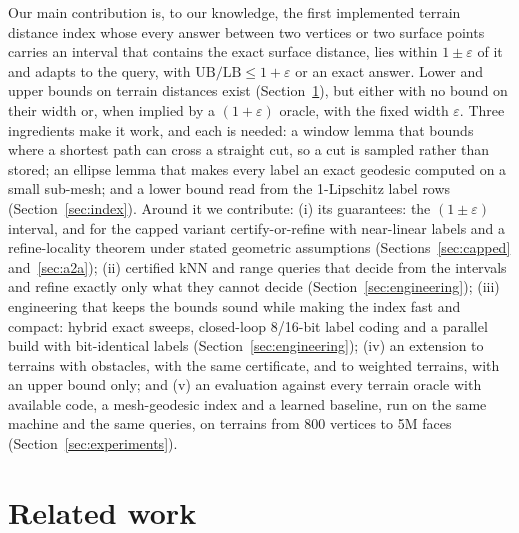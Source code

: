 \documentclass[sigconf,nonacm,screen]{acmart}
\newcommand{\LB}{\mathrm{LB}}
\newcommand{\UB}{\mathrm{UB}}
\newcommand{\eps}{\varepsilon}
\begin{document}
Our main contribution is, to our knowledge, the first implemented terrain distance index whose every answer
between two vertices or two surface points carries an interval that contains the exact surface distance, lies within
$1\pm\eps$ of it and adapts to the query, with $\UB/\LB\le1+\eps$ or an exact answer. Lower and upper bounds on
terrain distances exist (Section~\ref{sec:related}), but either with no bound on their width or, when implied by a
$(1+\eps)$ oracle, with the fixed width $\eps$. Three ingredients make it work, and each is needed: a window lemma that bounds
where a shortest path can cross a straight cut, so a cut is sampled rather than stored; an ellipse lemma that makes
every label an exact geodesic computed on a small sub-mesh; and a lower bound read from the 1-Lipschitz label rows
(Section~\ref{sec:index}). Around it we contribute:
(i) its guarantees: the $(1\pm\eps)$ interval, and for the capped variant certify-or-refine with near-linear labels
and a refine-locality theorem under stated geometric assumptions (Sections~\ref{sec:capped} and~\ref{sec:a2a});
(ii) certified kNN and range queries that decide from the intervals and refine exactly only what they cannot decide
(Section~\ref{sec:engineering});
(iii) engineering that keeps the bounds sound while making the index fast and compact: hybrid exact sweeps,
closed-loop 8/16-bit label coding and a parallel build with bit-identical labels (Section~\ref{sec:engineering});
(iv) an extension to terrains with obstacles, with the same certificate, and to weighted terrains, with an
upper bound only; and
(v) an evaluation against every terrain oracle with available code, a mesh-geodesic index and a learned baseline,
run on the same machine and the same queries, on terrains from 800 vertices to 5M faces
(Section~\ref{sec:experiments}).

\section{Related work}
\label{sec:related}
\end{document}
